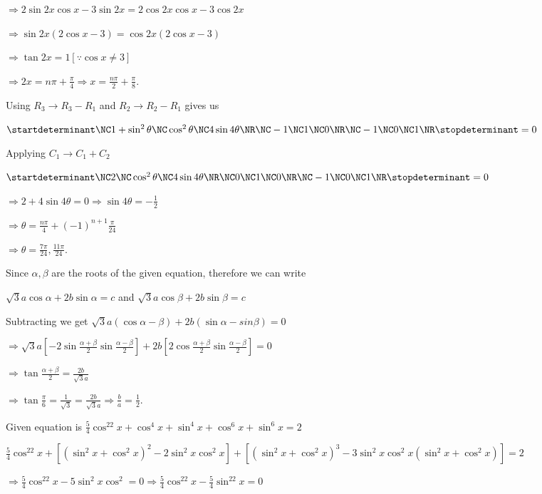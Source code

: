   $\Rightarrow 2\sin2x\cos x - 3\sin2x = 2\cos2x\cos x - 3\cos2x$

  $\Rightarrow \sin2x(2\cos x - 3) = \cos2x(2\cos x - 3)$

  $\Rightarrow \tan2x = 1[\because \cos x\ne 3]$

  $\Rightarrow 2x = n\pi + \frac{\pi}{4}\Rightarrow x = \frac{n\pi}{2} + \frac{\pi}{8}$.
\item Using $R_3\rightarrow R_3 - R_1$ and $R_2\rightarrow R_2 - R_1$ gives us

  $\startdeterminant\NC 1 + \sin^2\theta\NC \cos^2\theta\NC 4\sin4\theta\NR\NC -1\NC 1\NC 0\NR\NC -1\NC
  0\NC 1\NR\stopdeterminant = 0$

  Applying $C_1\rightarrow C_1 + C_2$

  $\startdeterminant\NC 2\NC \cos^2\theta\NC 4\sin4\theta\NR\NC 0\NC 1\NC 0\NR\NC -1\NC 0\NC
  1\NR\stopdeterminant = 0$

  $\Rightarrow 2 + 4\sin4\theta = 0\Rightarrow \sin4\theta = -\frac{1}{2}$

  $\Rightarrow \theta = \frac{n\pi}{4} + (-1)^{n + 1}\frac{\pi}{24}$

  $\Rightarrow \theta = \frac{7\pi}{24}, \frac{11\pi}{24}$.
\item Since $\alpha, \beta$ are the roots of the given equation, therefore we can write

  $\sqrt{3}a\cos\alpha + 2b\sin\alpha = c$ and $\sqrt{3}a\cos\beta + 2b\sin\beta = c$

  Subtracting we get $\sqrt{3}a(\cos\alpha - \beta) + 2b(\sin\alpha - sin\beta) = 0$

  $\Rightarrow \sqrt{3}a\left[-2\sin\frac{\alpha + \beta}{2}\sin\frac{\alpha - \beta}{2}\right] +
  2b\left[2\cos\frac{\alpha + \beta}{2}\sin\frac{\alpha - \beta}{2}\right] = 0$

  $\Rightarrow \tan\frac{\alpha + \beta}{2} = \frac{2b}{\sqrt{3}a}$

  $\Rightarrow \tan\frac{\pi}{6} = \frac{1}{\sqrt{3}} = \frac{2b}{\sqrt{3}a}\Rightarrow \frac{b}{a}
  = \frac{1}{2}$.
\item Given equation is $\frac{5}{4}\cos^22x + \cos^4x + \sin^4x + \cos^6x + \sin^6x = 2$

  $\frac{5}{4}\cos^22x + \left[\left(\sin^2x + \cos^2x\right)^2 - 2\sin^2x\cos^2x\right]
  + \left[\left(\sin^2x + \cos^2x\right)^3 - 3\sin^2x\cos^2x\left(\sin^2x + \cos^2x\right)\right] = 2$

  $\Rightarrow \frac{5}{4}\cos^22x - 5\sin^2x\cos^2 = 0\Rightarrow \frac{5}{4}\cos^22x - \frac{5}{4}\sin^22x
  = 0$

